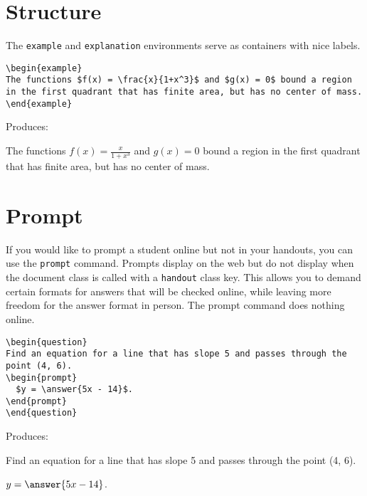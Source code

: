 \documentclass{ximera}
\begin{document}
\section{Structure} \label{StructuralEnvironments}

\begin{example}
The \verb!example! and \verb!explanation! environments serve as containers with nice labels. 

\begin{verbatim}
\begin{example}
The functions $f(x) = \frac{x}{1+x^3}$ and $g(x) = 0$ bound a region in the first quadrant that has finite area, but has no center of mass. 
\end{example}
\end{verbatim}

Produces:
\begin{example}
The functions $f(x) = \frac{x}{1+x^3}$ and $g(x) = 0$ bound a region in the first quadrant that has finite area, but has no center of mass. 
\end{example}
\end{example}

\section{Prompt} \label{Prompts}

\begin{example} If you would like to prompt a student online but not in your handouts, you can use the \verb!prompt! command. Prompts display on the web but do not display when the document class is called with a \verb!handout! class key. This allows you to demand certain formats for answers that will be checked online, while leaving more freedom for the answer format in person. The prompt command does nothing online.

\begin{verbatim}
\begin{question}
Find an equation for a line that has slope 5 and passes through the point (4, 6). 
\begin{prompt} 
  $y = \answer{5x - 14}$.
\end{prompt} 
\end{question}
\end{verbatim}

Produces:

\begin{question}
Find an equation for a line that has slope 5 and passes through the point (4, 6). 
\begin{prompt} 
  $y = \answer{5x - 14}$.
\end{prompt} 
\end{question}

\end{example}
\end{document}
